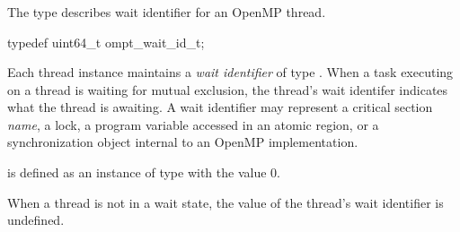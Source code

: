 \subsubsection{}

\label{sec:ompt_wait_id_t}

\summary

The  type describes wait identifier for an OpenMP thread.



\format
\begin{ccppspecific}
\begin{omptOther}
typedef uint64_t ompt_wait_id_t;
\end{omptOther}
\end{ccppspecific}

\descr

Each thread instance maintains a \emph{wait identifier} of type .
When a task executing on a thread is waiting for mutual exclusion, the thread's wait identifer indicates what the thread is awaiting.
A wait identifier may represent a critical section {\em name}, a lock, a program variable accessed in an atomic region, or a synchronization object internal to an OpenMP implementation.

 is defined as an instance of type  with the 
value 0.


When a thread is not in a wait state, the value of the thread's wait identifier is undefined.

